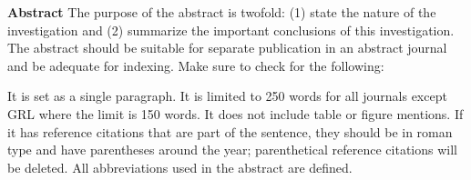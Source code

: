 \textbf{Abstract}
The purpose of the abstract is twofold: (1) state the nature of the investigation and (2) summarize the important conclusions of this investigation. The abstract should be suitable for separate publication in an abstract journal and be adequate for indexing. Make sure to check for the following:

    It is set as a single paragraph.
    It is limited to 250 words for all journals except GRL where the limit is 150 words.
    It does not include table or figure mentions.
    If it has reference citations that are part of the sentence, they should be in roman type and have parentheses around the year; parenthetical reference citations will be deleted.
    All abbreviations used in the abstract are defined.
